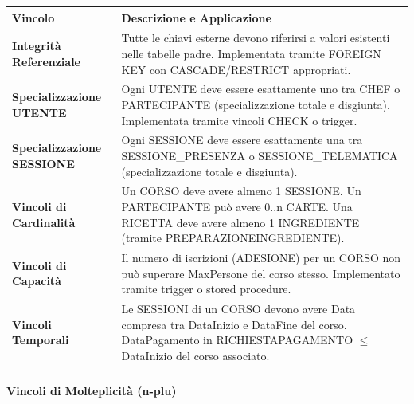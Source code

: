 \begin{center}
\begin{tcolorbox}[colback=white!98!gray, colframe=myblue!80!black, title=Vincoli Inter-relazionali, arc=4mm, boxrule=0.8pt, width=0.98\textwidth]
\renewcommand{\arraystretch}{1.2}
\begin{tabularx}{\textwidth}{p{4cm}X}
\textbf{Vincolo} & \textbf{Descrizione e Applicazione} \\
\hline
\textbf{Integrità Referenziale} & Tutte le chiavi esterne devono riferirsi a valori esistenti nelle tabelle padre. Implementata tramite FOREIGN KEY con CASCADE/RESTRICT appropriati. \\
\hline
\textbf{Specializzazione UTENTE} & Ogni UTENTE deve essere esattamente uno tra CHEF o PARTECIPANTE (specializzazione totale e disgiunta). Implementata tramite vincoli CHECK o trigger. \\
\hline
\textbf{Specializzazione SESSIONE} & Ogni SESSIONE deve essere esattamente una tra SESSIONE\_PRESENZA o SESSIONE\_TELEMATICA (specializzazione totale e disgiunta). \\
\hline
\textbf{Vincoli di Cardinalità} & Un CORSO deve avere almeno 1 SESSIONE. Un PARTECIPANTE può avere 0..n CARTE. Una RICETTA deve avere almeno 1 INGREDIENTE (tramite PREPARAZIONEINGREDIENTE). \\
\hline
\textbf{Vincoli di Capacità} & Il numero di iscrizioni (ADESIONE) per un CORSO non può superare MaxPersone del corso stesso. Implementato tramite trigger o stored procedure. \\
\hline
\textbf{Vincoli Temporali} & Le SESSIONI di un CORSO devono avere Data compresa tra DataInizio e DataFine del corso. DataPagamento in RICHIESTAPAGAMENTO $\leq$ DataInizio del corso associato. \\
\hline
\end{tabularx}
\end{tcolorbox}
\end{center}

\paragraph{Vincoli di Molteplicità (n-plu)}


